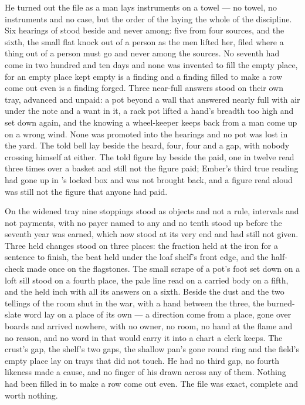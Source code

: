 He turned out the file as a man lays instruments on a towel --- no towel, no instruments and no case, but the order of the laying the whole of the discipline. Six hearings of  stood beside and never among: five from four sources, and the sixth, the small flat knock out of a person as the men lifted her, filed where a thing out of a person must go and never among the sources. No seventh had come in two hundred and ten days and none was invented to fill the empty place, for an empty place kept empty is a finding and a finding filled to make a row come out even is a finding forged. Three near-full answers stood on their own tray, advanced and unpaid: a pot beyond a wall that answered nearly full with air under the note and a want in it, a rack pot lifted a hand's breadth too high and set down again, and the knowing a wheel-keeper keeps back from a man come up on a wrong wind. None was promoted into the hearings and no pot was lost in the yard. The told bell lay beside the heard, four, four and a gap, with nobody crossing himself at either. The told figure lay beside the paid, one in twelve read three times over a basket and still not the figure paid; Ember's third true reading had gone up  in 's locked box and was not brought back, and a figure read aloud was still not the figure that anyone had paid.

On the widened tray nine stoppings stood as objects and not a rule, intervals and not payments, with no payer named to any and no tenth stood up before the seventh year was earned, which now stood at its very end and had still not given. Three held changes stood on three places: the fraction held at the iron for a sentence to finish, the beat held under the loaf shelf's front edge, and the half-check made once on the flagstones. The small scrape of a pot's foot set down on a loft sill stood on a fourth place, the pale line read on a carried body on a fifth, and the held inch with all its answers on a sixth. Beside the dust and the two tellings of the room shut in the war, with a hand between the three, the burned-slate word lay on a place of its own --- a direction come from a place, gone over boards and arrived nowhere, with no owner, no room, no hand at the flame and no reason, and no word in  that would carry it into a chart a clerk keeps. The crust's gap, the shelf's two gaps, the shallow pan's gone round ring and the field's empty place lay on trays that did not touch. He had no third gap, no fourth likeness made a cause, and no finger of his drawn across any of them. Nothing had been filled in to make a row come out even. The file was exact, complete and worth nothing.


